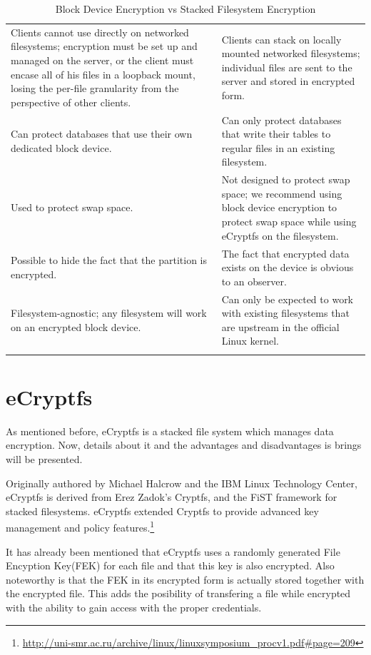 \begin{center}
\begin{table}[tp]
\begin{tabularx}{\textwidth}{|| m{} || m{} ||}
		\hhline{|:=::=:|}
		Clients cannot use directly on networked filesystems; encryption must be set up and managed on the server, or the client must encase all of his files in a loopback mount, losing the per-file granularity from the perspective of other clients. & Clients can stack on locally mounted networked filesystems; individual files are sent to the server and stored in encrypted form. \\
		\hhline{|:=::=:|}
		Can protect databases that use their own dedicated block device. & Can only protect databases that write their tables to regular files in an existing filesystem. \\
		\hhline{|:=::=:|}
		Used to protect swap space. & Not designed to protect swap space; we recommend using block device encryption to protect swap space while using eCryptfs on the filesystem. \\
		\hhline{|:=::=:|}
		Possible to hide the fact that the partition is encrypted. & The fact that encrypted data exists on the device is obvious to an observer. \\
		\hhline{|:=::=:|}
		Filesystem-agnostic; any filesystem will work on an encrypted block device. & Can only be expected to work with existing filesystems that are upstream in the official Linux kernel. \\
		\hhline{|b:=:b:=:b|}
	\end{tabularx}
	\caption{Block Device Encryption vs Stacked Filesystem Encryption}
\end{table}
\end{center}
\newpage

\section{eCryptfs}
\label{sec:de-ecryptfs}

As mentioned before, eCryptfs is a stacked file system which manages data encryption. Now, details about it and the advantages and disadvantages is brings will be presented.

Originally authored by Michael Halcrow and the IBM Linux Technology Center, eCryptfs is derived from Erez Zadok's Cryptfs, and the FiST framework for stacked filesystems. eCryptfs extended Cryptfs to provide advanced key management and policy features.\footnote{\url{http://uni-smr.ac.ru/archive/linux/linuxsymposium_procv1.pdf\#page=209}}

It has already been mentioned that eCryptfs uses a randomly generated File Encyption Key(FEK) for each file and that this key is also encrypted. Also noteworthy is that the FEK in its encrypted form is actually stored together with the encrypted file. This adds the posibility of transfering a file while encrypted with the ability to gain access with the proper credentials.

